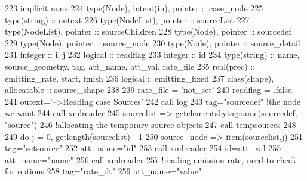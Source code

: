 \begin{DoxyCode}
223     \textcolor{keywordtype}{implicit none}
224     \textcolor{keywordtype}{type}(Node), \textcolor{keywordtype}{intent(in)}, \textcolor{keywordtype}{pointer} :: case\_node
225     \textcolor{keywordtype}{type}(string) :: outext
226     \textcolor{keywordtype}{type}(NodeList), \textcolor{keywordtype}{pointer} :: sourceList
227     \textcolor{keywordtype}{type}(NodeList), \textcolor{keywordtype}{pointer} :: sourceChildren
228     \textcolor{keywordtype}{type}(Node), \textcolor{keywordtype}{pointer} :: sourcedef
229     \textcolor{keywordtype}{type}(Node), \textcolor{keywordtype}{pointer} :: source\_node
230     \textcolor{keywordtype}{type}(Node), \textcolor{keywordtype}{pointer} :: source\_detail
231     \textcolor{keywordtype}{integer} :: i, j
232     \textcolor{keywordtype}{logical} :: readflag
233     \textcolor{keywordtype}{integer} :: id
234     \textcolor{keywordtype}{type}(string) :: name, source\_geometry, tag, att\_name, att\_val, rate\_file
235     \textcolor{keywordtype}{real(prec)} :: emitting\_rate, start, finish
236     \textcolor{keywordtype}{logical} :: emitting\_fixed
237     \textcolor{keywordtype}{class}(shape), \textcolor{keywordtype}{allocatable} :: source\_shape
238 
239     rate\_file = \textcolor{stringliteral}{'not\_set'}
240     readflag = .false.
241     outext=\textcolor{stringliteral}{'-->Reading case Sources'}
242     \textcolor{keyword}{call }log%
243     tag=\textcolor{stringliteral}{"sourcedef"}    \textcolor{comment}{!the node we want}
244     \textcolor{keyword}{call }xmlreader%
245     sourcelist => getelementsbytagname(sourcedef, \textcolor{stringliteral}{"source"})
246     \textcolor{comment}{!allocating the temporary source objects}
247     \textcolor{keyword}{call }tempsources%
248 
249     \textcolor{keywordflow}{do} j = 0, getlength(sourcelist) - 1
250         source\_node => item(sourcelist,j)
251         tag=\textcolor{stringliteral}{"setsource"}
252         att\_name=\textcolor{stringliteral}{"id"}
253         \textcolor{keyword}{call }xmlreader%
254         id=att\_val%
255         att\_name=\textcolor{stringliteral}{"name"}
256         \textcolor{keyword}{call }xmlreader%
257         \textcolor{comment}{!reading emission rate, need to check for options}
258         tag=\textcolor{stringliteral}{"rate\_dt"}
259         att\_name=\textcolor{stringliteral}{"value"}

\end{DoxyCode}

